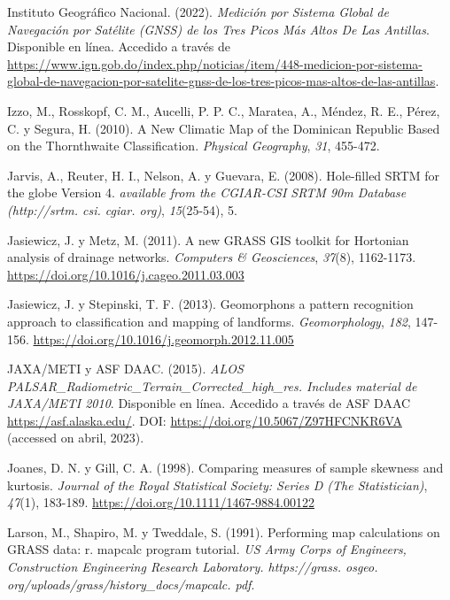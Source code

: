 \documentclass[spanish]{article}
\newlength{\cslhangindent}
\newlength{\cslentryspacingunit} %
\newenvironment{CSLReferences}[2] %
 {%
  \setlength{\parindent}{0pt}
  \ifodd #1
  \let\oldpar\par
  \def\par{\hangindent=\cslhangindent\oldpar}
  \fi
  \setlength{\parskip}{#2\cslentryspacingunit}
 }%
 {}
\begin{document}
\begin{CSLReferences}{1}{0}
\leavevmode{}%
Instituto Geográfico Nacional. (2022). \emph{Medición por Sistema Global
de Navegación por Satélite (GNSS) de los Tres Picos Más Altos De Las
Antillas}. Disponible en línea. Accedido a través de
\url{https://www.ign.gob.do/index.php/noticias/item/448-medicion-por-sistema-global-de-navegacion-por-satelite-gnss-de-los-tres-picos-mas-altos-de-las-antillas}.

\leavevmode{}%
Izzo, M., Rosskopf, C. M., Aucelli, P. P. C., Maratea, A., Méndez, R.
E., Pérez, C. y Segura, H. (2010). A New Climatic Map of the Dominican
Republic Based on the Thornthwaite Classification. \emph{Physical
Geography}, \emph{31}, 455-472.

\leavevmode{}%
Jarvis, A., Reuter, H. I., Nelson, A. y Guevara, E. (2008). Hole-filled
SRTM for the globe Version 4. \emph{available from the CGIAR-CSI SRTM
90m Database (http://srtm. csi. cgiar. org)}, \emph{15}(25-54), 5.

\leavevmode{}%
Jasiewicz, J. y Metz, M. (2011). A new GRASS GIS toolkit for Hortonian
analysis of drainage networks. \emph{Computers \& Geosciences},
\emph{37}(8), 1162-1173.
\url{https://doi.org/10.1016/j.cageo.2011.03.003}

\leavevmode{}%
Jasiewicz, J. y Stepinski, T. F. (2013). Geomorphons {\textemdash} a
pattern recognition approach to classification and mapping of landforms.
\emph{Geomorphology}, \emph{182}, 147-156.
\url{https://doi.org/10.1016/j.geomorph.2012.11.005}

\leavevmode{}%
JAXA/METI y ASF DAAC. (2015). \emph{{ALOS
PALSAR\_Radiometric\_Terrain\_Corrected\_high\_res. Includes material de
JAXA/METI 2010}}. Disponible en línea. Accedido a través de ASF DAAC
\url{https://asf.alaska.edu/}. DOI:
\url{https://doi.org/10.5067/Z97HFCNKR6VA} (accessed on abril, 2023).

\leavevmode{}%
Joanes, D. N. y Gill, C. A. (1998). Comparing measures of sample
skewness and kurtosis. \emph{Journal of the Royal Statistical Society:
Series D (The Statistician)}, \emph{47}(1), 183-189.
\url{https://doi.org/10.1111/1467-9884.00122}

\leavevmode{}%
Larson, M., Shapiro, M. y Tweddale, S. (1991). Performing map
calculations on GRASS data: r. mapcalc program tutorial. \emph{US Army
Corps of Engineers, Construction Engineering Research Laboratory.
https://grass. osgeo. org/uploads/grass/history{\_}docs/mapcalc. pdf}.


\end{CSLReferences}
\end{document}
